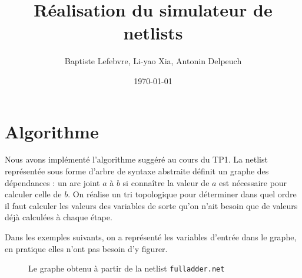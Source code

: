 \documentclass[a4paper]{article}
\begin{document}
\title{Réalisation du simulateur de netlists}
\author{Baptiste Lefebvre, Li-yao Xia, Antonin Delpeuch}
\date{\today}

\maketitle

\section{Algorithme}

Nous avons implémenté l'algorithme suggéré au cours du TP1.
La netlist représentée sous forme d'arbre de syntaxe abstraite définit un graphe des dépendances : un arc joint $a$ à $b$ si connaître la valeur de $a$ est nécessaire pour calculer celle de $b$.
On réalise un tri topologique pour déterminer dans quel ordre il faut calculer les valeurs des variables de sorte qu'on n'ait besoin que de valeurs déjà calculées à chaque étape.

Dans les exemples suivants, on a représenté les variables d'entrée dans le graphe, en pratique elles n'ont pas besoin d'y figurer.

\begin{figure}[h]
    \centering
{}
\caption{Le graphe obtenu à partir de la netlist \texttt{fulladder.net}}
\end{figure}
\end{document}
